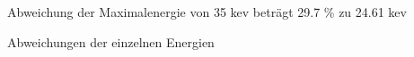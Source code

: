 


Abweichung der Maximalenergie von 35 kev beträgt 29.7 \% zu 24.61 kev

Abweichungen der einzelnen Energien
